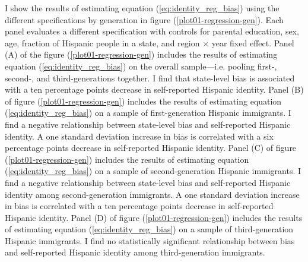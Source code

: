 \documentclass[12pt, fullpage]{article}
\begin{document}
I show the results of estimating equation (\ref{eq:identity_reg_bias}) using the different specifications by generation in figure (\ref{plot01-regression-gen}). Each panel evaluates a different specification with controls for parental education, sex, age, fraction of Hispanic people in a state, and region $\times$ year fixed effect. Panel (A) of the figure (\ref{plot01-regression-gen}) includes the results of estimating equation (\ref{eq:identity_reg_bias}) on the overall sample---i.e. pooling first-, second-, and third-generations together. I find that state-level bias is associated with a ten percentage points decrease in self-reported Hispanic identity. Panel (B) of figure (\ref{plot01-regression-gen}) includes the results of estimating equation (\ref{eq:identity_reg_bias}) on a sample of first-generation Hispanic immigrants. I find a negative relationship between state-level bias and self-reported Hispanic identity. A one standard deviation increase in bias is correlated with a six percentage points decrease in self-reported Hispanic identity. Panel (C) of figure (\ref{plot01-regression-gen}) includes the results of estimating equation (\ref{eq:identity_reg_bias}) on a sample of second-generation Hispanic immigrants. I find a negative relationship between state-level bias and self-reported Hispanic identity among second-generation immigrants. A one standard deviation increase in bias is correlated with a ten percentage points decrease in self-reported Hispanic identity. Panel (D) of figure (\ref{plot01-regression-gen}) includes the results of estimating equation (\ref{eq:identity_reg_bias}) on a sample of third-generation Hispanic immigrants. I find no statistically significant relationship between bias and self-reported Hispanic identity among third-generation immigrants. 
\end{document}
